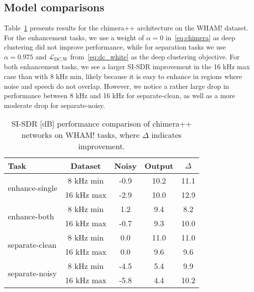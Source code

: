 \documentclass[a4paper]{article}
\begin{document}
\subsection{Model comparisons}
Table~\ref{table:compare} presents results for the chimera++ architecture on the WHAM! dataset.  For the enhancement tasks, we use a weight of $\alpha=0$ in~\eqref{eq:chimera} as deep clustering did not improve performance, while for separation tasks we use $\alpha=0.975$ and $\mathcal{L}_{\text{DC},\text{W}}$ from~\eqref{eq:dc_white} as the deep clustering objective.  For both enhancement tasks, we see a larger SI-SDR improvement in the 16 kHz max case than with 8 kHz min, likely because it is easy to enhance in regions where noise and speech do not overlap.  However, we notice a rather large drop in performance between 8 kHz and 16 kHz for separate-clean, as well as a more moderate drop for separate-noisy. 

 \begin{table}[tbp]
    \footnotesize
    \caption{SI-SDR [dB] performance comparison of chimera++ networks on WHAM! tasks, where $\Delta$ indicates  improvement.}\vspace{-0.6cm}
    \begin{center}
      \label{table:compare}
      \begin{tabular}{lcccc}\hline
        Task & Dataset & Noisy & Output & $\Delta$ \\ \hline \hline
        \multirow{2}{*}{enhance-single} & \phantom{1}8 kHz min & -0.9 & 10.2 & 11.1  \\
         & 16 kHz max & -2.9 & 10.0 & 12.9  \\ \hline
        \multirow{2}{*}{enhance-both} & \phantom{1}8 kHz min & \phantom{-}1.2 & \phantom{1}9.4 & \phantom{1}8.2  \\ 
         & 16 kHz max & -0.7 & \phantom{1}9.3 & 10.0  \\ \hline
        \multirow{2}{*}{separate-clean} & \phantom{1}8 kHz min & \phantom{-}0.0 & 11.0 & 11.0  \\ 
         & 16 kHz max & \phantom{-}0.0 & \phantom{1}9.6 & \phantom{1}9.6  \\ \hline
        \multirow{2}{*}{separate-noisy} & \phantom{1}8 kHz min & -4.5 & \phantom{1}5.4 & \phantom{1}9.9  \\ 
        & 16 kHz max & -5.8 & \phantom{1}4.4 & 10.2  \\ \hline
      \end{tabular}\vspace{-.5cm}
    \end{center}
  \end{table}
  
\end{document}
